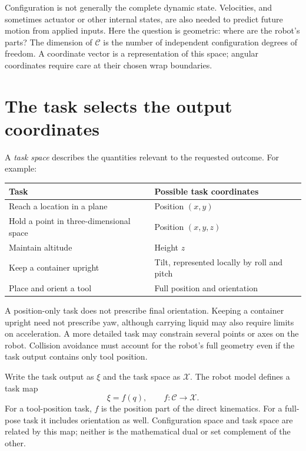 Configuration is not generally the complete dynamic state. Velocities,
and sometimes actuator or other internal states, are also needed to
predict future motion from applied inputs. Here the question is geometric:
where are the robot's parts? The dimension of $\mathcal C$ is the number
of independent configuration degrees of freedom. A coordinate vector is
a representation of this space; angular coordinates require care at their
chosen wrap boundaries.

\section{The task selects the output coordinates}
A \emph{task space} describes the quantities relevant to the requested
outcome. For example:
\begin{center}
\begin{tabular}{p{.44\linewidth}p{.46\linewidth}}
\toprule
Task & Possible task coordinates\\
\midrule
Reach a location in a plane & Position $(x,y)$\\
Hold a point in three-dimensional space & Position $(x,y,z)$\\
Maintain altitude & Height $z$\\
Keep a container upright & Tilt, represented locally by roll and pitch\\
Place and orient a tool & Full position and orientation\\
\bottomrule
\end{tabular}
\end{center}
A position-only task does not prescribe final orientation. Keeping a
container upright need not prescribe yaw, although carrying liquid may
also require limits on acceleration. A more detailed task may constrain
several points or axes on the robot. Collision avoidance must account for
the robot's full geometry even if the task output contains only tool
position.

Write the task output as $\xi$ and the task space as $\mathcal X$.
The robot model defines a task map
\begin{equation}
 \xi=f(q),\qquad f:\mathcal C\longrightarrow\mathcal X.
 \label{eq:l11-taskmap}
\end{equation}
For a tool-position task, $f$ is the position part of the direct kinematics.
For a full-pose task it includes orientation as well. Configuration space
and task space are related by this map; neither is the mathematical dual
or set complement of the other.

